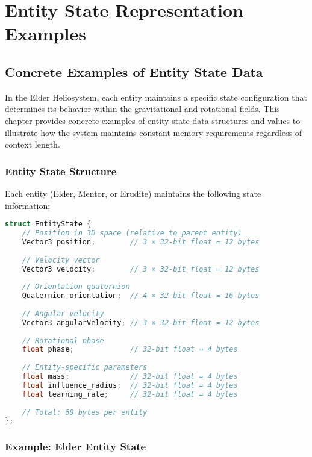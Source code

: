 \chapter{Entity State Representation Examples}

\section{Concrete Examples of Entity State Data}

In the Elder Heliosystem, each entity maintains a specific state configuration that determines its behavior within the gravitational and rotational fields. This chapter provides concrete examples of entity state data structures and values to illustrate how the system maintains constant memory requirements regardless of context length.

\subsection{Entity State Structure}

Each entity (Elder, Mentor, or Erudite) maintains the following state information:

\begin{lstlisting}[language=C++, caption=Entity State Data Structure]
struct EntityState {
    // Position in 3D space (relative to parent entity)
    Vector3 position;        // 3 × 32-bit float = 12 bytes
    
    // Velocity vector
    Vector3 velocity;        // 3 × 32-bit float = 12 bytes
    
    // Orientation quaternion
    Quaternion orientation;  // 4 × 32-bit float = 16 bytes
    
    // Angular velocity
    Vector3 angularVelocity; // 3 × 32-bit float = 12 bytes
    
    // Rotational phase
    float phase;             // 32-bit float = 4 bytes
    
    // Entity-specific parameters
    float mass;              // 32-bit float = 4 bytes
    float influence_radius;  // 32-bit float = 4 bytes
    float learning_rate;     // 32-bit float = 4 bytes
    
    // Total: 68 bytes per entity
};
\end{lstlisting}

\subsection{Example: Elder Entity State}

